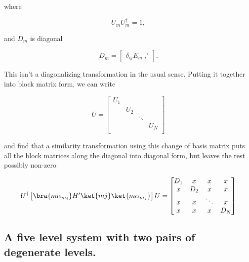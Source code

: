 where

\begin{equation}\label{eqn:pertubationDegeneracy:190}
U_m U_m^\dagger = 1,
\end{equation}

and $D_m$ is diagonal

\begin{equation}\label{eqn:pertubationDegeneracy:210}
D_m = 
\begin{bmatrix}
\delta_{ij} E_{m,i}'
\end{bmatrix}.
\end{equation}

This isn't a diagonalizing transformation in the usual sense.  Putting it together into block matrix form, we can write

\begin{equation}\label{eqn:pertubationDegeneracy:230}
U = 
\begin{bmatrix}
U_1 &   	&  	 & \\
    & U_2 	&  	 & \\
    &     	& \ddots & \\
    &     	&        & U_N \\
\end{bmatrix}
\end{equation}

and find that a similarity transformation using this change of basis matrix puts all the block matrices along the diagonal into diagonal form, but leaves the rest possibly non-zero

\begin{equation}\label{eqn:pertubationDegeneracy:250}
U^\dagger
\begin{bmatrix}
\bra{m \alpha_{m_i}} H' \ket{m j} \ket{m \alpha_{m_j}}
\end{bmatrix}
U
=
\begin{bmatrix}
D_1 & x 	& x	 & x \\
 x  & D_2 	& x	 & x \\
 x  & x   	& \ddots & x \\
 x  & x   	& x      & D_N \\
\end{bmatrix}
\end{equation}

\subsection{A five level system with two pairs of degenerate levels.}

